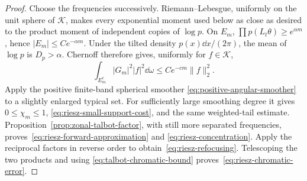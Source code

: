 \begin{proof}
Choose the frequencies successively.  Riemann--Lebesgue, uniformly on the unit
sphere of $\mathcal K$, makes every exponential moment used below as close as
desired to the product moment of independent copies of $\log p$.  On $E_m$,
$\prod p(L_t\theta)\geq e^{\alpha m}$, hence $|E_m|\leq Ce^{-\alpha m}$.
Under the tilted density $p(x)\dd x/(2\pi)$, the mean of $\log p$ is
$D_p>\alpha$.  Chernoff therefore gives, uniformly for $f\in\mathcal K$,
\begin{equation}
 \int_{E_m^c}|G_m|^2|f|^2\dd\omega
 \leq Ce^{-cm}\|f\|_2^2.
 \label{eq:riesz-tilted-large-deviation}
\end{equation}
Apply the positive finite-band spherical smoother
\eqref{eq:positive-angular-smoother} to a slightly enlarged typical set.
For sufficiently large smoothing degree it gives $0\leq\chi_m\leq1$,
\eqref{eq:riesz-small-support-cost}, and the same weighted-tail estimate.
Proposition~\ref{prop:zonal-talbot-factor}, with still more separated
frequencies, proves~\eqref{eq:riesz-forward-approximation} and
\eqref{eq:riesz-concentration}.  Apply the reciprocal factors in reverse order
to obtain~\eqref{eq:riesz-refocusing}.  Telescoping the two products and using
\eqref{eq:talbot-chromatic-bound} proves~\eqref{eq:riesz-chromatic-error}.
\end{proof}
